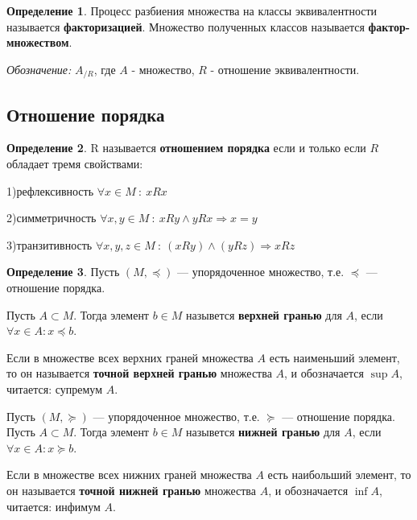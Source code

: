 \documentclass[12pt,oneside]{article}
\theoremstyle{definition}
\newtheorem{definition}{Определение}
\begin{document}
\begin{definition}
Процесс разбиения множества на классы эквивалентности называется \textbf{факторизацией}. Множество полученных классов называется \textbf{фактор-множеством}.

{\it Обозначение: } $A_{/R}$, где $A$ - множество, $R$ - отношение эквивалентности.
\end{definition}

\subsection{Отношение порядка}
\begin{definition}
R называется \textbf{отношением порядка} если и только если $R$ обладает тремя свойствами:

1)рефлексивность $\forall x\in M\ :\ xRx$

2)симметричность $\forall x,y\in M\ :\ xRy \wedge yRx \Longrightarrow x=y$

3)транзитивность $\forall x,y,z\in M\ :\ (xRy)\wedge (yRz) \Longrightarrow xRz$
\end{definition}

\begin{definition}
Пусть $(M, \preccurlyeq)$ --- упорядоченное множество, т.е. $\preccurlyeq$ --- отношение порядка.

Пусть $A\subset M$. Тогда элемент $b\in M$ назывется \textbf{верхней гранью} для $A$, если $\forall x\in A: x\preccurlyeq b$.

 Если в множестве всех верхних граней множества $A$ есть наименьший элемент, то он называется \textbf{точной верхней гранью} множества $A$, и обозначается $\sup A$, читается: супремум $A$.
 
Пусть $(M, \succcurlyeq)$ --- упорядоченное множество, т.е. $\succcurlyeq$ --- отношение порядка.
Пусть $A\subset M$. Тогда элемент $b\in M$ назывется \textbf{нижней гранью} для $A$, если $\forall x\in A: x\succcurlyeq b$.

 Если в множестве всех нижних граней множества $A$ есть наибольший элемент, то он называется \textbf{точной нижней гранью} множества $A$, и обозначается $\inf A$, читается: инфимум $A$.
\end{definition}
\end{document}
